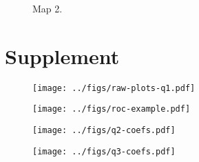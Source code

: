 \documentclass[11pt,english]{article}
\begin{document}
\clearpage
\begin{figure}[htb]
  \begin{center}
    \caption{Map 2.
    }
    \label{fig:}
  \end{center}
\end{figure}


\clearpage
\section{Supplement}

\renewcommand{\thefigure}{S\arabic{figure}}
\renewcommand{\thetable}{S\arabic{table}}
\setcounter{figure}{0}
\setcounter{table}{0}

\begin{figure}[htb]
  \begin{center}
    \texttt{[image: ../figs/raw-plots-q1.pdf]}
    \caption{
    }
    \label{fig:}
  \end{center}
\end{figure}



\begin{figure}[htb]
  \begin{center}
    \texttt{[image: ../figs/roc-example.pdf]}
    \caption{
    }
    \label{fig:}
  \end{center}
\end{figure}

\begin{figure}[htb]
  \begin{center}
    \texttt{[image: ../figs/q2-coefs.pdf]}
    \caption{
    }
    \label{fig:}
  \end{center}
\end{figure}

\begin{figure}[htb]
  \begin{center}
    \texttt{[image: ../figs/q3-coefs.pdf]}
    \caption{
    }
    \label{fig:}
  \end{center}
\end{figure}

\end{document}
